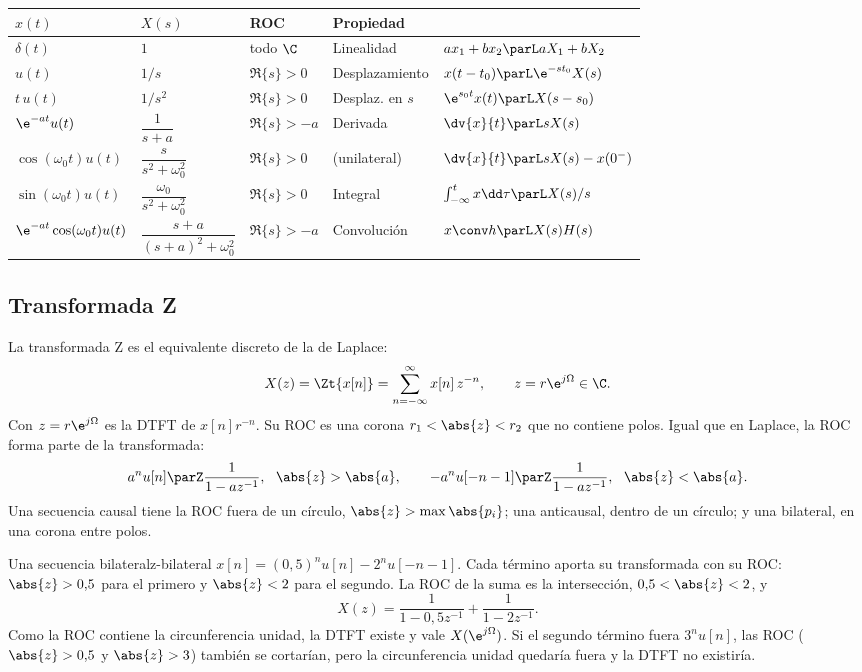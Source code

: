 \documentclass[11pt,a4paper]{scrartcl}
\begin{document}
\begin{center}
  \small
  \renewcommand{\arraystretch}{1.3}
  \begin{tabular}{@{}lll@{\qquad}ll@{}}
    \toprule
    $x(t)$ & $X(s)$ & ROC & Propiedad & \\\midrule
    $\delta(t)$ & $1$ & todo $\C$ & Linealidad & $a x_1+b x_2\parL aX_1+bX_2$\\
    $u(t)$ & $1/s$ & $\Re\{s\}>0$ & Desplazamiento & $x(t-t_0)\parL\e^{-st_0}X(s)$\\
    $t\,u(t)$ & $1/s^2$ & $\Re\{s\}>0$ & Desplaz. en $s$ & $\e^{s_0t}x(t)\parL X(s-s_0)$\\
    $\e^{-at}u(t)$ & $\dfrac{1}{s+a}$ & $\Re\{s\}>-a$ & Derivada & $\dv{x}{t}\parL sX(s)$\\
    $\cos(\omega_0t)u(t)$ & $\dfrac{s}{s^2+\omega_0^2}$ & $\Re\{s\}>0$ & \quad (unilateral) & $\dv{x}{t}\parL sX(s)-x(0^-)$\\
    $\sin(\omega_0t)u(t)$ & $\dfrac{\omega_0}{s^2+\omega_0^2}$ & $\Re\{s\}>0$ & Integral & $\int_{-\infty}^{t}x\dd\tau\parL X(s)/s$\\
    $\e^{-at}\cos(\omega_0t)u(t)$ & $\dfrac{s+a}{(s+a)^2+\omega_0^2}$ & $\Re\{s\}>-a$ & Convolución & $x\conv h\parL X(s)H(s)$\\\bottomrule
  \end{tabular}
\end{center}

\subsection{Transformada Z}

La transformada Z es el equivalente discreto de la de Laplace:
\[
  X(z)=\Zt\{x[n]\}=\sum_{n=-\infty}^{\infty}x[n]\,z^{-n},\qquad z=r\e^{j\Omega}\in\C.
\]
Con $z=r\e^{j\Omega}$ es la DTFT de $x[n]r^{-n}$. Su ROC es una corona $r_1<\abs{z}<r_2$ que no contiene polos. Igual que en Laplace, la ROC forma parte de la transformada:
\[
  a^nu[n]\parZ\frac{1}{1-az^{-1}},\ \ \abs{z}>\abs{a},\qquad
  -a^nu[-n-1]\parZ\frac{1}{1-az^{-1}},\ \ \abs{z}<\abs{a}.
\]
Una secuencia causal tiene la ROC fuera de un círculo, $\abs{z}>\max\abs{p_i}$; una anticausal, dentro de un círculo; y una bilateral, en una corona entre polos.

\begin{ejemplo}{Una secuencia bilateral}{z-bilateral}
  $x[n]=(0{,}5)^nu[n]-2^nu[-n-1]$. Cada término aporta su transformada con su ROC: $\abs{z}>0{,}5$ para el primero y $\abs{z}<2$ para el segundo. La ROC de la suma es la intersección, $0{,}5<\abs{z}<2$, y
  \[
    X(z)=\frac{1}{1-0{,}5z^{-1}}+\frac{1}{1-2z^{-1}}.
  \]
  Como la ROC contiene la circunferencia unidad, la DTFT existe y vale $X(\e^{j\Omega})$. Si el segundo término fuera $3^nu[n]$, las ROC ($\abs{z}>0{,}5$ y $\abs{z}>3$) también se cortarían, pero la circunferencia unidad quedaría fuera y la DTFT no existiría.
\end{ejemplo}
\end{document}
